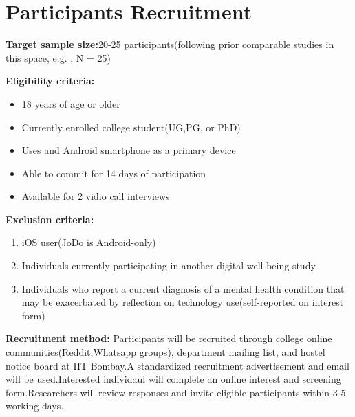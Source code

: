 \documentclass[12pt,a4paper]{article}
\begin{document}
\section{Participants Recruitment}
\textbf{Target sample size:}20-25 participants(following prior comparable studies in this space, e.g. \cite{karthik2026}, N = 25)

\textbf{Eligibility criteria:}
\begin{itemize}
    \item 18 years of age or older
    \item Currently enrolled college student(UG,PG, or PhD)
    \item Uses and Android smartphone as a primary device
    \item Able to commit for 14 days of participation
    \item Available for 2 vidio call interviews
\end{itemize}
\textbf{Exclusion criteria:}
\begin{enumerate}
    \item iOS user(JoDo is Android-only)
    \item Individuals currently participating in another digital well-being study
    \item Individuals who report a current diagnosis of a mental health condition that may be exacerbated by reflection on technology use(self-reported on interest form)
\end{enumerate}

\textbf{Recruitment method:}
Participants will be recruited through college online communities(Reddit,Whatsapp groups), department mailing list, and hostel notice board at IIT Bombay.A standardized recruitment advertisement and email will be used.Interested individaul will complete an online interest and screening form.Researchers will review responses and invite eligible participants within 3-5 working days.
\end{document}
